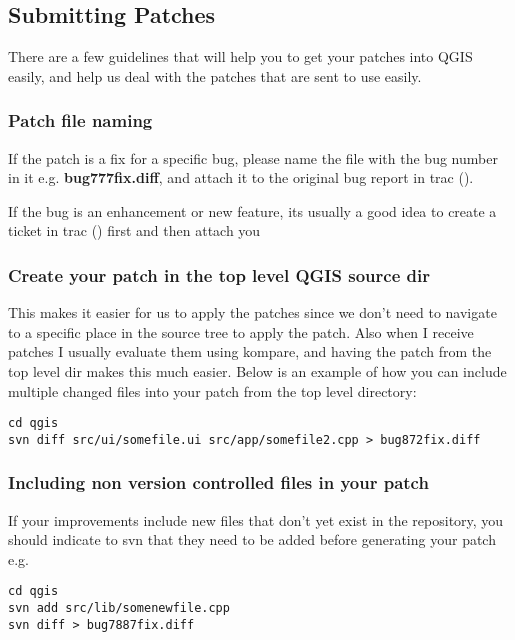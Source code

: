 \hypertarget{toc39}{}
\subsection{Submitting Patches}
There are a few guidelines that will help you to get your patches into QGIS
easily, and help us deal with the patches that are sent to use easily.

\hypertarget{toc40}{}
\subsubsection{Patch file naming}
If the patch is a fix for a specific bug, please name the file with the bug
number in it e.g.  \textbf{bug777fix.diff}, and attach it to the original bug report
in trac ().

If the bug is an enhancement or new feature, its usually a good idea to create
a ticket in trac () first and then attach you 

\hypertarget{toc41}{}
\subsubsection{Create your patch in the top level QGIS source dir}
This makes it easier for us to apply the patches since we don't need to
navigate to a specific place in the source tree to apply the patch. Also when I
receive patches I usually evaluate them using kompare, and having the patch
from the top level dir makes this much easier. Below is an example of how you
can include multiple changed files into your patch from the top level
directory:

\begin{verbatim}
cd qgis
svn diff src/ui/somefile.ui src/app/somefile2.cpp > bug872fix.diff
\end{verbatim}

\hypertarget{toc42}{}
\subsubsection{Including non version controlled files in your patch}
If your improvements include new files that don't yet exist in the repository,
you should indicate to svn that they need to be added before generating your
patch e.g.

\begin{verbatim}
cd qgis
svn add src/lib/somenewfile.cpp
svn diff > bug7887fix.diff
\end{verbatim}

